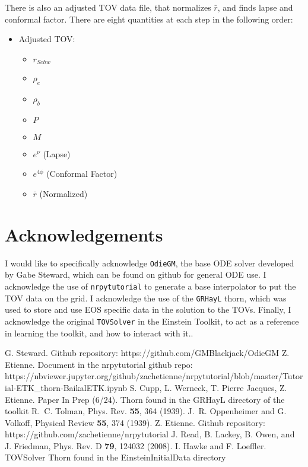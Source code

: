 There is also an adjusted TOV data file, that normalizes $\bar{r}$, and finds lapse
and conformal factor. There are eight quantities at each step in the following
order:

\begin{itemize}
    \item Adjusted TOV:
        \begin{itemize}
            \item $r_{Schw}$
            \item $\rho_{e}$
            \item $\rho_{b}$
            \item $P$
            \item $M$
            \item $e^{\nu}$ (Lapse)
            \item $e^{4\phi}$ (Conformal Factor)
            \item $\bar{r}$ (Normalized)
        \end{itemize}
\end{itemize}

\section{Acknowledgements}

I would like to specifically acknowledge {\tt OdieGM}, the base ODE solver developed by Gabe Steward, which can be found on github for general ODE use. I acknowledge the use of {\tt nrpytutorial}\cite{NRpy} to generate a base interpolator to put the TOV data on the grid. I acknowledge the use of the {\tt GRHayL} thorn, which was used to store and use EOS specific data in the solution to the TOVs. Finally, I acknowledge the original {\tt TOVSolver} in the Einstein Toolkit, to act as a reference in learning the toolkit, and how to interact with it.\cite{Hawke}.

\begin{thebibliography}{9}
G. Steward. Github repository: https://github.com/GMBlackjack/OdieGM
%
Z. Etienne. Document in the nrpytutorial github repo: https://nbviewer.jupyter.org/github/zachetienne/nrpytutorial/blob/master/Tutorial-ETK\_thorn-BaikalETK.ipynb
%
S. Cupp, L. Werneck, T. Pierre Jacques, Z. Etienne. Paper In Prep (6/24). Thorn found in the GRHayL directory of the toolkit
%
R.~C. Tolman, Phys. Rev. {\bf 55}, 364 (1939).
%
J.~R. Oppenheimer and G. Volkoff, Physical Review {\bf 55}, 374 (1939).
%
Z. Etienne. Github repository: https://github.com/zachetienne/nrpytutorial
%
J. Read, B. Lackey, B. Owen, and J. Friedman, Phys. Rev. D {\bf 79}, 124032 (2008).
%
I. Hawke and F. Loeffler. TOVSolver Thorn found in the EinsteinInitialData directory
%
\end{thebibliography}



